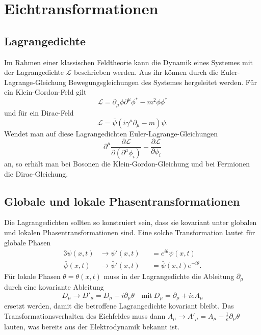 \chapter{Eichtransformationen}
\section{Lagrangedichte}
Im Rahmen einer klassischen Feldtheorie kann die Dynamik eines Systemes mit der Lagrangedichte $\mathcal{L}$ beschrieben werden.
Aus ihr können durch die Euler-Lagrange-Gleichung Bewegungsgleichungen des Systemes hergeleitet werden.
Für ein Klein-Gordon-Feld gilt
\begin{equation*}
	\mathcal{L} = \partial_\mu\phi\partial^\mu\phi^* - m^2\phi\phi^*
\end{equation*}
und für ein Dirac-Feld
\begin{equation*}
	\mathcal{L} = \bar{\psi}(i\gamma^\mu\partial_\mu - m)\psi.
\end{equation*}
Wendet man auf diese Lagrangedichten Euler-Lagrange-Gleichungen
\begin{equation*}
	\partial^\mu\frac{\partial\mathcal{L}}{\partial(\partial^\mu\phi_i)}-\frac{\partial\mathcal{L}}{\partial\phi_i}
\end{equation*}
an, so erhält man bei Bosonen die Klein-Gordon-Gleichung und bei Fermionen die Dirac-Gleichung.

\section{Globale und lokale Phasentransformationen}
Die Lagrangedichten sollten so konstruiert sein, dass sie kovariant unter globalen und lokalen Phasentransformationen sind.
Eine solche Transformation lautet für globale Phasen
\begin{alignat*}{3}
	\psi(x,t) &\rightarrow \psi'(x,t) &&= e^{i\theta}\psi(x,t) \\
	\bar{\psi}(x,t) &\rightarrow\bar{\psi}'(x,t) &&= \bar{\psi}(x,t)e^{-i\theta}.
\end{alignat*}
Für lokale Phasen $\theta=\theta(x,t)$ muss in der Lagrangedichte die Ableitung $\partial_\mu$ durch eine kovariante Ableitung
\begin{equation*}
D_\mu\rightarrow D'_\mu = D_\mu - i\partial_\mu\theta	\quad\text{mit}\ D_\mu=\partial_\mu + ieA_\mu
\end{equation*}
ersetzt werden, damit die betroffene Lagrangedichte kovariant bleibt.
Das Transformationsverhalten des Eichfeldes muss dann $A_\mu\rightarrow A'_\mu=A_\mu-\frac{1}{e}\partial_\mu\theta$ lauten, was bereits aus der Elektrodynamik bekannt ist.

